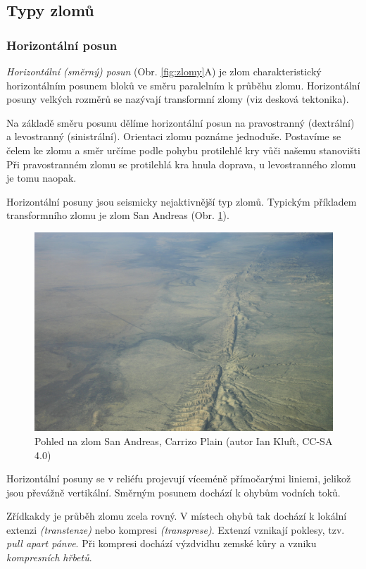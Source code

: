 \subsection{Typy zlomů}
\subsubsection{Horizontální posun}
\emph{Horizontální (směrný) posun} (Obr. \ref{fig:zlomy}A) je zlom charakteristický horizontálním posunem bloků ve směru paralelním k průběhu zlomu. Horizontální posuny velkých rozměrů se nazývají transformní zlomy (viz desková tektonika).

Na základě směru posunu dělíme horizontální posun na pravostranný (dextrální) a levostranný (sinistrální). Orientaci zlomu poznáme jednoduše. Postavíme se čelem ke zlomu a směr určíme podle pohybu protilehlé kry vůči našemu stanovišti Při pravostranném zlomu se protilehlá kra hnula doprava, u levostranného zlomu je tomu naopak. 

Horizontální posuny jsou seismicky nejaktivnější typ zlomů. Typickým příkladem transformního zlomu je zlom San Andreas (Obr. \ref{fig:san_andreas}).

\begin{figure}
	\centering
	\includegraphics[width=1\linewidth]{obrazky/tectonic/san_andreas}
	\caption{Pohled na zlom San Andreas, Carrizo Plain (autor Ian Kluft, CC-SA 4.0)}
	\label{fig:san_andreas}
\end{figure}

Horizontální posuny se v reliéfu projevují víceméně přímočarými liniemi, jelikož jsou převážně vertikální. Směrným posunem dochází k ohybům vodních toků. 

Zřídkakdy je průběh zlomu zcela rovný. V místech ohybů tak dochází k lokální extenzi \emph{(transtenze)} nebo kompresi \emph{(transprese)}. Extenzí vznikají poklesy, tzv. \emph{pull apart pánve}. Při kompresi dochází výzdvidhu zemské kůry a vzniku \emph{kompresních hřbetů}.

